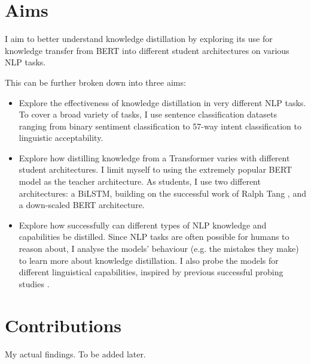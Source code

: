 \documentclass[bsc,frontabs,singlespacing,parskip,deptreport]{infthesis}
\begin{document}
{{  %
  }
  
  \section{Aims}{
    I aim to better understand knowledge distillation by exploring its use for knowledge transfer from BERT into different student architectures on various NLP tasks.

    This can be further broken down into three aims:
    \begin{itemize}
      \item Explore the effectiveness of knowledge distillation in very different NLP tasks. To cover a broad variety of tasks, I use sentence classification datasets ranging from binary sentiment classification to 57-way intent classification to linguistic acceptability.
      \item Explore how distilling knowledge from a Transformer varies with different student architectures. I limit myself to using the extremely popular BERT model \citep{Devlin_2018} as the teacher architecture. As students, I use two different architectures: a BiLSTM, building on the successful work of Ralph Tang \citep{Tang_2019a,Tang_2019b}, and a down-scaled BERT architecture.
      \item Explore how successfully can different types of NLP knowledge and capabilities be distilled. Since NLP tasks are often possible for humans to reason about, I analyse the models' behaviour (e.g. the mistakes they make) to learn more about knowledge distillation. I also probe the models for different linguistical capabilities, inspired by previous successful probing studies \citep{Conneau_2018,Tenney_2019b}.
    \end{itemize}
  }
  
  \section{Contributions}{
    My actual findings. To be added later.
  }
}
\end{document}

